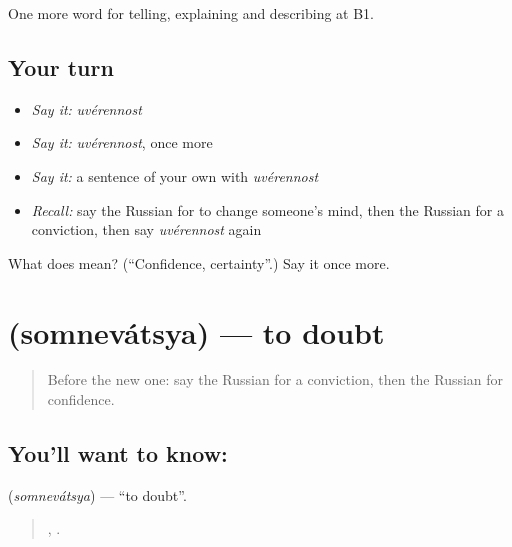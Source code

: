 \begin{grammarlens}[title={What you've built}]
One more word for telling, explaining and describing at B1.
\end{grammarlens}

\subsection*{Your turn}
\begin{itemize}
\raggedright
  \item \emph{Say it:} \emph{uvérennost}
  \item \emph{Say it:} \emph{uvérennost}, once more
  \item \emph{Say it:} a sentence of your own with \emph{uvérennost}
  \item \emph{Recall:} say the Russian for to change someone’s mind, then the Russian for a conviction, then say \emph{uvérennost} again
\end{itemize}

\begin{tcolorbox}[breakable,colback=teal!4,colframe=teal!35!black,title={Before you move on}]
What does  mean? (\textquotedblleft{}Confidence, certainty\textquotedblright{}.) Say it once more.
\end{tcolorbox}
\section[\texorpdfstring{\ru{сомневаться} (somnevátsya)}{сомневаться (somnevátsya)}]{ (somnevátsya) — to doubt}

\label{lesson:RU-C339-somnevatsya}



\begin{quote}
Before the new one: say the Russian for a conviction, then the Russian for confidence.
\end{quote}

\subsection*{You'll want to know: }
\textbf{} (\emph{somnevátsya}) — \textquotedblleft{}to doubt\textquotedblright{}.

\begin{quote}
 ,    .
\end{quote}

